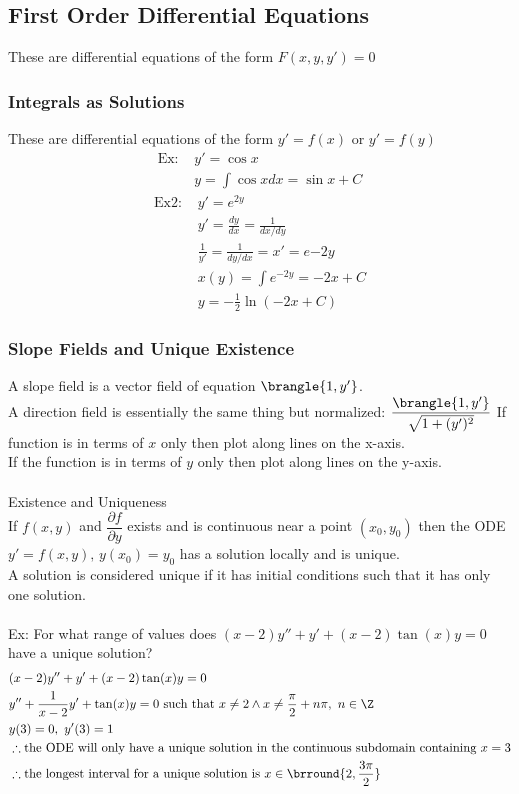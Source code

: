 \subsection{First Order Differential Equations}
These are differential equations of the form $F(x,y,y')=0$
\subsubsection{Integrals as Solutions}
These are differential equations of the form $y'=f(x)$ or $y'=f(y)$\\
\begin{align*}
    \text{Ex: }&y'=\cos x\\
    &y=\int\cos xdx=\sin x+C
\end{align*}
\begin{align*}
    \text{Ex2: }&y'=e^{2y}\\
    &y'=\frac{dy}{dx}=\frac{1}{dx/dy}\\
    &\frac{1}{y'}=\frac{1}{dy/dx}=x'=e{-2y}\\
    &x(y)=\int e^{-2y}=-2x+C\\
    &y=-\frac{1}{2}\ln(-2x+C)
\end{align*}
\subsubsection{Slope Fields and Unique Existence}
A slope field is a vector field of equation $\brangle{1,y'}$.\\
A direction field is essentially the same thing but normalized: $\dfrac{\brangle{1,y'}}{\sqrt{1+(y')^2}}$
If function is in terms of $x$ only then plot along lines on the x-axis.\\
If the function is in terms of $y$ only then plot along lines on the y-axis.\\
\\
Existence and Uniqueness\\
If $f(x,y)$ and $\dfrac{\partial f}{\partial y}$ exists and is continuous near a point $(x_0,y_0)$ then the ODE $y'=f(x,y),\,y(x_0)=y_0$ has a solution locally and is unique.\\
A solution is considered unique if it has initial conditions such that it has only one solution.\\
\\
Ex: For what range of values does $(x-2)y''+y'+(x-2)\tan(x)y=0$ have a unique solution?
\begin{align*}
    &(x-2)y''+y'+(x-2)\tan(x)y=0\\
    &y''+\frac{1}{x-2}y'+\tan(x)y=0\text{ such that }x\neq 2\wedge x\neq \frac{\pi}{2}+n\pi,\ n\in\Z\\
    &y(3)=0,\ y'(3)=1\\
    &\therefore\text{the ODE will only have a unique solution in the continuous subdomain containing }x=3\\
    &\therefore\text{the longest interval for a unique solution is }x\in\brround{2,\frac{3\pi}{2}}
\end{align*}
